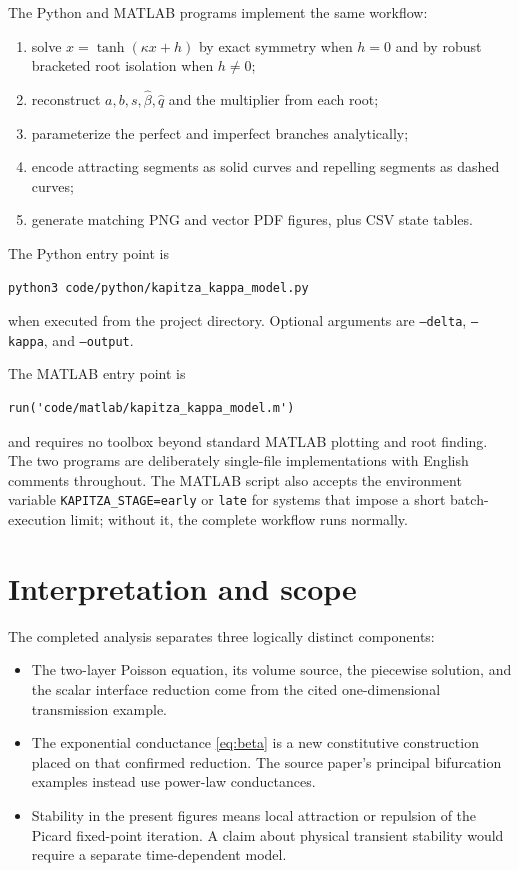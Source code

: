 \documentclass[10pt,a4paper]{article}
\newcommand{\betahat}{\widehat{\beta}}
\newcommand{\qhat}{\widehat{q}}
\begin{document}
The Python and MATLAB programs implement the same workflow:
\begin{enumerate}
  \item solve \(x=\tanh(\kappa x+h)\) by exact symmetry when \(h=0\) and by
        robust bracketed root isolation when \(h\neq0\);
  \item reconstruct \(a,b,s,\betahat,\qhat\) and the multiplier from each root;
  \item parameterize the perfect and imperfect branches analytically;
  \item encode attracting segments as solid curves and repelling segments as
        dashed curves;
  \item generate matching PNG and vector PDF figures, plus CSV state tables.
\end{enumerate}

The Python entry point is
\begin{lstlisting}
python3 code/python/kapitza_kappa_model.py
\end{lstlisting}
when executed from the project directory. Optional arguments are
\texttt{--delta}, \texttt{--kappa}, and \texttt{--output}.

The MATLAB entry point is
\begin{lstlisting}
run('code/matlab/kapitza_kappa_model.m')
\end{lstlisting}
and requires no toolbox beyond standard MATLAB plotting and root finding. The
two programs are deliberately single-file implementations with English
comments throughout. The MATLAB script also accepts the environment variable
\texttt{KAPITZA\_STAGE=early} or \texttt{late} for systems that impose a short
batch-execution limit; without it, the complete workflow runs normally.

\section{Interpretation and scope}

The completed analysis separates three logically distinct components:
\begin{itemize}
  \item The two-layer Poisson equation, its volume source, the piecewise
        solution, and the scalar interface reduction come from the cited
        one-dimensional transmission example.
  \item The exponential conductance \eqref{eq:beta} is a new constitutive
        construction placed on that confirmed reduction. The source paper's
        principal bifurcation examples instead use power-law conductances.
  \item Stability in the present figures means local attraction or repulsion
        of the Picard fixed-point iteration. A claim about physical transient
        stability would require a separate time-dependent model.
\end{itemize}
\end{document}
